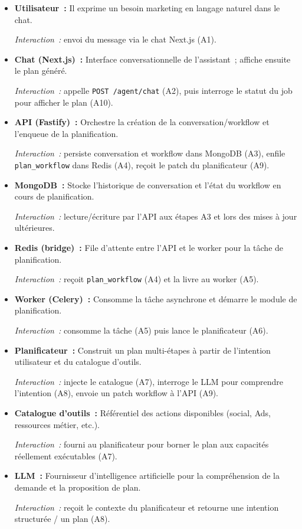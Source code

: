 \documentclass[12pt,a4paper]{report}
\numberwithin{figure}{chapter}
\numberwithin{table}{chapter}
\begin{document}
\begin{itemize}[leftmargin=2em,itemsep=6pt]

\item \textbf{Utilisateur~:}
Il exprime un besoin marketing en langage naturel dans le chat.

\textit{Interaction~:} envoi du message via le chat Next.js (A1).

\item \textbf{Chat (Next.js)~:}
Interface conversationnelle de l’assistant~; affiche ensuite le plan généré.

\textit{Interaction~:} appelle \texttt{POST /agent/chat} (A2), puis interroge le statut du job pour afficher le plan (A10).

\item \textbf{API (Fastify)~:}
Orchestre la création de la conversation/workflow et l’enqueue de la planification.

\textit{Interaction~:} persiste conversation et workflow dans MongoDB (A3), enfile \texttt{plan\_workflow} dans Redis (A4), reçoit le patch du planificateur (A9).

\item \textbf{MongoDB~:}
Stocke l’historique de conversation et l’état du workflow en cours de planification.

\textit{Interaction~:} lecture/écriture par l’API aux étapes A3 et lors des mises à jour ultérieures.

\item \textbf{Redis (bridge)~:}
File d’attente entre l’API et le worker pour la tâche de planification.

\textit{Interaction~:} reçoit \texttt{plan\_workflow} (A4) et la livre au worker (A5).

\item \textbf{Worker (Celery)~:}
Consomme la tâche asynchrone et démarre le module de planification.

\textit{Interaction~:} consomme la tâche (A5) puis lance le planificateur (A6).

\item \textbf{Planificateur~:}
Construit un plan multi-étapes à partir de l’intention utilisateur et du catalogue d’outils.

\textit{Interaction~:} injecte le catalogue (A7), interroge le LLM pour comprendre l’intention (A8), envoie un patch workflow à l’API (A9).

\item \textbf{Catalogue d’outils~:}
Référentiel des actions disponibles (social, Ads, ressources métier, etc.).

\textit{Interaction~:} fourni au planificateur pour borner le plan aux capacités réellement exécutables (A7).

\item \textbf{LLM~:}
Fournisseur d’intelligence artificielle pour la compréhension de la demande et la proposition de plan.

\textit{Interaction~:} reçoit le contexte du planificateur et retourne une intention structurée / un plan (A8).

\end{itemize}
\end{document}
